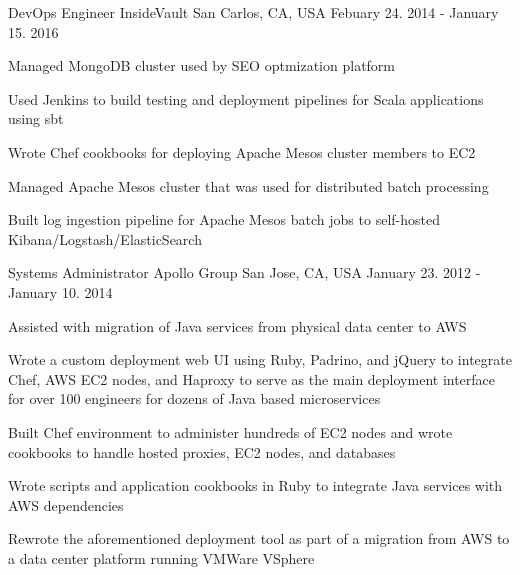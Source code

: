 \begin{cventries}
  \cventry
    {DevOps Engineer} %
    {InsideVault} %
    {San Carlos, CA, USA} %
    {Febuary 24. 2014 - January 15. 2016} %
    {
      \begin{cvitems}
        \item {Managed MongoDB cluster used by SEO optmization platform}
        \item {Used Jenkins to build testing and deployment pipelines for Scala applications using sbt}
        \item {Wrote Chef cookbooks for deploying Apache Mesos cluster members to EC2}
        \item {Managed Apache Mesos cluster that was used for distributed batch processing}
        \item {Built log ingestion pipeline for Apache Mesos batch jobs to self-hosted Kibana/Logstash/ElasticSearch}
      \end{cvitems}
    }
  \cventry
    {Systems Administrator} %
    {Apollo Group} %
    {San Jose, CA, USA} %
    {January 23. 2012 - January 10. 2014} %
    {
      \begin{cvitems} %
        \item {Assisted with migration of Java services from physical data center to AWS}
        \item {Wrote a custom deployment web UI using Ruby, Padrino, and jQuery to integrate Chef, AWS EC2 nodes, and Haproxy to serve as the main deployment interface for over 100 engineers for dozens of Java based microservices}
        \item {Built Chef environment to administer hundreds of EC2 nodes and wrote cookbooks to handle hosted proxies, EC2 nodes, and databases}
        \item {Wrote scripts and application cookbooks in Ruby to integrate Java services with AWS dependencies}
        \item {Rewrote the aforementioned deployment tool as part of a migration from AWS to a data center platform running VMWare VSphere}
      \end{cvitems}
    }
\end{cventries}
